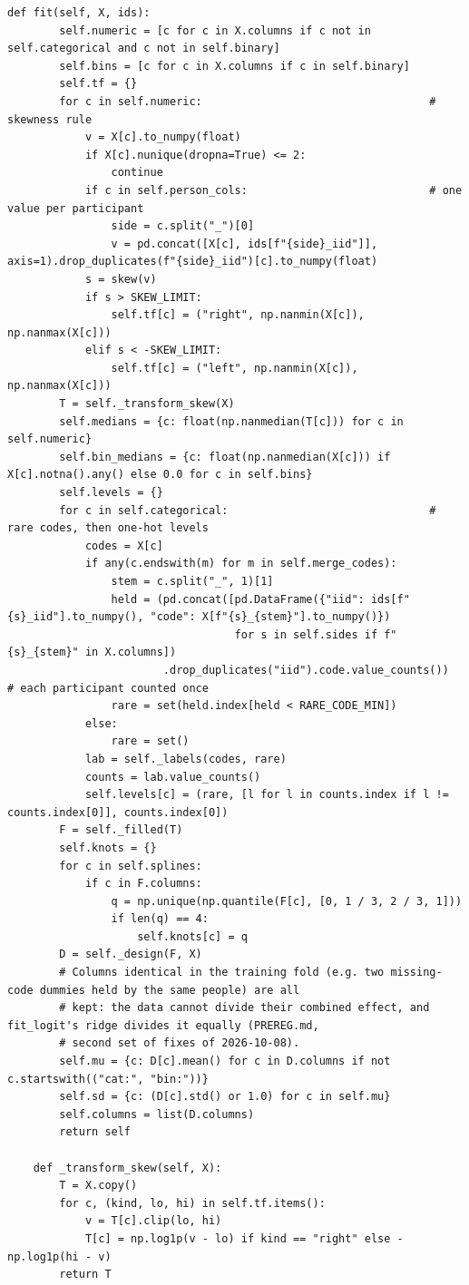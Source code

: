 \documentclass[11pt]{article}
\begin{document}
\begin{lstlisting}[caption={Fitting the preparation on a training fold (scripts/modeling.py)}]
    def fit(self, X, ids):
        self.numeric = [c for c in X.columns if c not in self.categorical and c not in self.binary]
        self.bins = [c for c in X.columns if c in self.binary]
        self.tf = {}
        for c in self.numeric:                                   # skewness rule
            v = X[c].to_numpy(float)
            if X[c].nunique(dropna=True) <= 2:
                continue
            if c in self.person_cols:                            # one value per participant
                side = c.split("_")[0]
                v = pd.concat([X[c], ids[f"{side}_iid"]], axis=1).drop_duplicates(f"{side}_iid")[c].to_numpy(float)
            s = skew(v)
            if s > SKEW_LIMIT:
                self.tf[c] = ("right", np.nanmin(X[c]), np.nanmax(X[c]))
            elif s < -SKEW_LIMIT:
                self.tf[c] = ("left", np.nanmin(X[c]), np.nanmax(X[c]))
        T = self._transform_skew(X)
        self.medians = {c: float(np.nanmedian(T[c])) for c in self.numeric}
        self.bin_medians = {c: float(np.nanmedian(X[c])) if X[c].notna().any() else 0.0 for c in self.bins}
        self.levels = {}
        for c in self.categorical:                               # rare codes, then one-hot levels
            codes = X[c]
            if any(c.endswith(m) for m in self.merge_codes):
                stem = c.split("_", 1)[1]
                held = (pd.concat([pd.DataFrame({"iid": ids[f"{s}_iid"].to_numpy(), "code": X[f"{s}_{stem}"].to_numpy()})
                                   for s in self.sides if f"{s}_{stem}" in X.columns])
                        .drop_duplicates("iid").code.value_counts())       # each participant counted once
                rare = set(held.index[held < RARE_CODE_MIN])
            else:
                rare = set()
            lab = self._labels(codes, rare)
            counts = lab.value_counts()
            self.levels[c] = (rare, [l for l in counts.index if l != counts.index[0]], counts.index[0])
        F = self._filled(T)
        self.knots = {}
        for c in self.splines:
            if c in F.columns:
                q = np.unique(np.quantile(F[c], [0, 1 / 3, 2 / 3, 1]))
                if len(q) == 4:
                    self.knots[c] = q
        D = self._design(F, X)
        # Columns identical in the training fold (e.g. two missing-code dummies held by the same people) are all
        # kept: the data cannot divide their combined effect, and fit_logit's ridge divides it equally (PREREG.md,
        # second set of fixes of 2026-10-08).
        self.mu = {c: D[c].mean() for c in D.columns if not c.startswith(("cat:", "bin:"))}
        self.sd = {c: (D[c].std() or 1.0) for c in self.mu}
        self.columns = list(D.columns)
        return self

    def _transform_skew(self, X):
        T = X.copy()
        for c, (kind, lo, hi) in self.tf.items():
            v = T[c].clip(lo, hi)
            T[c] = np.log1p(v - lo) if kind == "right" else -np.log1p(hi - v)
        return T
\end{lstlisting}
\end{document}
